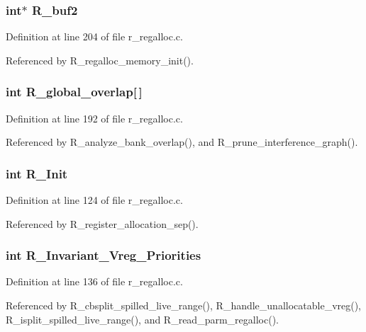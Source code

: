\subsubsection{\setlength{\rightskip}{0pt plus 5cm}int$\ast$ \bf{R\_\-buf2}}\label{r__regalloc_8h_381cd998a24acd64ba259059d37582c5}




Definition at line 204 of file r\_\-regalloc.c.

Referenced by R\_\-regalloc\_\-memory\_\-init().
\subsubsection{\setlength{\rightskip}{0pt plus 5cm}int \bf{R\_\-global\_\-overlap}[$\,$]}\label{r__regalloc_8h_d9149b93aecd9f2589b72d8dee36dea6}




Definition at line 192 of file r\_\-regalloc.c.

Referenced by R\_\-analyze\_\-bank\_\-overlap(), and R\_\-prune\_\-interference\_\-graph().
\subsubsection{\setlength{\rightskip}{0pt plus 5cm}int \bf{R\_\-Init}}\label{r__regalloc_8h_449a2a9288e72e91e512dc072c8c4ec2}




Definition at line 124 of file r\_\-regalloc.c.

Referenced by R\_\-register\_\-allocation\_\-sep().
\subsubsection{\setlength{\rightskip}{0pt plus 5cm}int \bf{R\_\-Invariant\_\-Vreg\_\-Priorities}}\label{r__regalloc_8h_ed4046d2e70d6083273a5c1cb109c7af}




Definition at line 136 of file r\_\-regalloc.c.

Referenced by R\_\-cbsplit\_\-spilled\_\-live\_\-range(), R\_\-handle\_\-unallocatable\_\-vreg(), R\_\-isplit\_\-spilled\_\-live\_\-range(), and R\_\-read\_\-parm\_\-regalloc().
